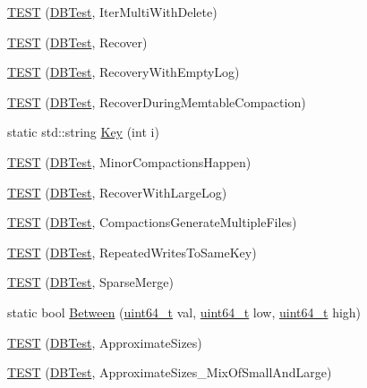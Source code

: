 \begin{DoxyCompactItemize}
\item 
\hyperlink{namespaceleveldb_a3e41cdc91355438f57b9497b01c66e24}{T\+E\+S\+T} (\hyperlink{classleveldb_1_1_d_b_test}{D\+B\+Test}, Iter\+Multi\+With\+Delete)
\item 
\hyperlink{namespaceleveldb_ab1872cabf2fb215814f9a6f1bacacc80}{T\+E\+S\+T} (\hyperlink{classleveldb_1_1_d_b_test}{D\+B\+Test}, Recover)
\item 
\hyperlink{namespaceleveldb_a890ebffd31d77bc8acb760088d70ee8c}{T\+E\+S\+T} (\hyperlink{classleveldb_1_1_d_b_test}{D\+B\+Test}, Recovery\+With\+Empty\+Log)
\item 
\hyperlink{namespaceleveldb_a2e24806457c57e7dec22e3c05e46a82c}{T\+E\+S\+T} (\hyperlink{classleveldb_1_1_d_b_test}{D\+B\+Test}, Recover\+During\+Memtable\+Compaction)
\item 
static std\+::string \hyperlink{namespaceleveldb_af5ebf23c4f21b4986d6f8fb430739287}{Key} (int i)
\item 
\hyperlink{namespaceleveldb_a1ff90ae7b19ecf46c5efb6e5af00fa0a}{T\+E\+S\+T} (\hyperlink{classleveldb_1_1_d_b_test}{D\+B\+Test}, Minor\+Compactions\+Happen)
\item 
\hyperlink{namespaceleveldb_a01bbbae1753711e8b7740ed8faa9efd6}{T\+E\+S\+T} (\hyperlink{classleveldb_1_1_d_b_test}{D\+B\+Test}, Recover\+With\+Large\+Log)
\item 
\hyperlink{namespaceleveldb_acd61524dbc544e8f1ca63fbdfac59791}{T\+E\+S\+T} (\hyperlink{classleveldb_1_1_d_b_test}{D\+B\+Test}, Compactions\+Generate\+Multiple\+Files)
\item 
\hyperlink{namespaceleveldb_acb51ac2eb77bd1af22372748f9fb44da}{T\+E\+S\+T} (\hyperlink{classleveldb_1_1_d_b_test}{D\+B\+Test}, Repeated\+Writes\+To\+Same\+Key)
\item 
\hyperlink{namespaceleveldb_a0ed510b8c03c1ca0216ffee81199d79e}{T\+E\+S\+T} (\hyperlink{classleveldb_1_1_d_b_test}{D\+B\+Test}, Sparse\+Merge)
\item 
static bool \hyperlink{namespaceleveldb_a891b358b4c0a10a44b24b8f473cc73fd}{Between} (\hyperlink{stdint_8h_aaa5d1cd013383c889537491c3cfd9aad}{uint64\+\_\+t} val, \hyperlink{stdint_8h_aaa5d1cd013383c889537491c3cfd9aad}{uint64\+\_\+t} low, \hyperlink{stdint_8h_aaa5d1cd013383c889537491c3cfd9aad}{uint64\+\_\+t} high)
\item 
\hyperlink{namespaceleveldb_a6b3f1122dc9d727f0c699ed3da2d6474}{T\+E\+S\+T} (\hyperlink{classleveldb_1_1_d_b_test}{D\+B\+Test}, Approximate\+Sizes)
\item 
\hyperlink{namespaceleveldb_a5c41c70ccd20279235316b8627f419da}{T\+E\+S\+T} (\hyperlink{classleveldb_1_1_d_b_test}{D\+B\+Test}, Approximate\+Sizes\+\_\+\+Mix\+Of\+Small\+And\+Large)

\end{DoxyCompactItemize}
